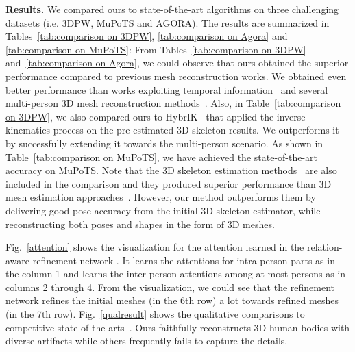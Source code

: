 \documentclass[runningheads]{llncs}
\begin{document}
\noindent \textbf{Results.} We compared ours to state-of-the-art algorithms on three challenging datasets (i.e. 3DPW, MuPoTS and AGORA). The results are summarized in Tables~\ref{tab:comparison on 3DPW}, \ref{tab:comparison on Agora} and \ref{tab:comparison on MuPoTS}: From Tables~\ref{tab:comparison on 3DPW} and~\ref{tab:comparison on Agora}, we could observe that ours obtained the superior performance compared to previous mesh reconstruction works. We obtained even better performance than works exploiting temporal information~\cite{kanazawa2019learning,kocabas2020vibe} and several multi-person 3D mesh reconstruction methods~\cite{choi20213Dcrowdnet,jiang2020coherent,sun2021monocular,zhang2021body}. Also, in Table~\ref{tab:comparison on 3DPW}, we also compared ours to HybrIK~\cite{li2021hybrik} that applied the inverse kinematics process on the pre-estimated 3D skeleton results. We outperforms it by successfully extending it towards the multi-person scenario. As shown in Table~\ref{tab:comparison on MuPoTS}, we have achieved the state-of-the-art accuracy on MuPoTS. Note that the 3D skeleton estimation methods~\cite{cheng2021monocular,moon2019camera,sarandi2020metrabs} are also included in the comparison and they produced superior performance than 3D mesh estimation approaches~\cite{kocabas2021pare,kocabas2021spec,sun2021monocular,zhang2021body}. However, our method outperforms them by delivering good pose accuracy from the initial 3D skeleton estimator, while reconstructing both poses and shapes in the form of 3D meshes. 

Fig.~\ref{attention} shows the visualization for the attention learned in the relation-aware refinement network . It learns the attentions for intra-person parts as in the column 1 and learns the inter-person attentions among at most  persons as in columns 2 through 4. From the visualization, we could see that the refinement network  refines the initial meshes (in the 6th row) a lot towards refined meshes (in the 7th row). Fig.~\ref{qualresult} shows the qualitative comparisons to competitive state-of-the-arts~\cite{kocabas2021pare,kocabas2021spec,sun2021monocular}. Ours faithfully reconstructs 3D human bodies with diverse artifacts while others frequently fails to capture the details.
\end{document}
